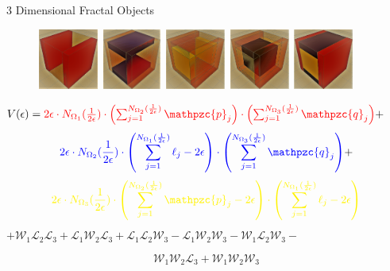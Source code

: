 \documentclass{if-beamer}
\newcommand{\W}{\mathcal{W}}
\newcommand{\SL}{\mathcal{L}}
\newcommand{\p}{\mathpzc{p}}
\newcommand{\q}{\mathpzc{q}}
\begin{document}
\begin{frame}{3 Dimensional Fractal Objects}

        \begin{figure}
            \includegraphics[height=2cm,width=2cm]{3dfractal_1.png}
            \hfill
            \includegraphics[height=2cm,width=2cm]{3dfractal_2.png}
            \hfill
            \includegraphics[height=2cm,width=2cm]{3dfractal_3.png}
            \hfill
            \includegraphics[height=2cm,width=2cm]{3dfractal_4.png}
            \hfill
            \includegraphics[height=2cm,width=2cm]{3dfractal_5}
        \end{figure}
        
        
$V(\epsilon) = \textcolor{red}{2\epsilon\cdot N_{\Omega_1}(\frac{1}{2\epsilon}) \cdot \left( \sum_{j=1}^{{N_{\Omega_2}}(\frac{1}{2\epsilon})}\p_j \right) \cdot \left( \sum_{j=1}^{{N_{\Omega_3}}(\frac{1}{2\epsilon})}\q_j \right)} +$
$$ \textcolor{blue}{2\epsilon\cdot N_{\Omega_2}(\frac{1}{2\epsilon}) \cdot \left( \sum_{j=1}^{{N_{\Omega_1}}(\frac{1}{2\epsilon})}\ell_j - 2\epsilon \right) \cdot \left( \sum_{j=1}^{{N_{\Omega_3}}(\frac{1}{2\epsilon})}\q_j \right)} + $$
$$\textcolor{yellow}{2\epsilon\cdot N_{\Omega_3}(\frac{1}{2\epsilon}) \cdot \left( \sum_{j=1}^{{N_{\Omega_2}}(\frac{1}{2\epsilon})}\p_j - 2\epsilon \right) \cdot \left( \sum_{j=1}^{{N_{\Omega_1}}(\frac{1}{2\epsilon})}\ell_j - 2\epsilon \right)} $$
$+ \W_1\SL_2\SL_3 + \SL_1\W_2\SL_3 + \SL_1\SL_2\W_3 - \SL_1\W_2\W_3 - \W_1\SL_2\W_3 - $

$$\W_1\W_2\SL_3 + \W_1\W_2\W_3$$

\end{frame}
\end{document}
